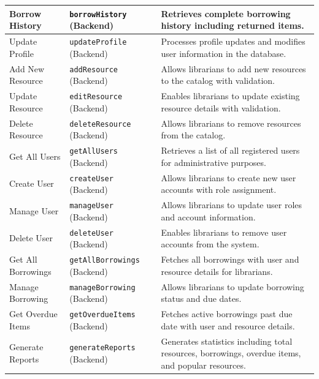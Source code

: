 \documentclass[11pt,a4paper]{article}
\begin{document}
\begin{longtable}{@{}p{3cm}p{4cm}p{6cm}@{}}
Borrow History & \texttt{borrowHistory} (Backend) & Retrieves complete borrowing history including returned items. \\
\midrule

Update Profile & \texttt{updateProfile} (Backend) & Processes profile updates and modifies user information in the database. \\
\midrule

Add New Resource & \texttt{addResource} (Backend) & Allows librarians to add new resources to the catalog with validation. \\
\midrule

Update Resource & \texttt{editResource} (Backend) & Enables librarians to update existing resource details with validation. \\
\midrule

Delete Resource & \texttt{deleteResource} (Backend) & Allows librarians to remove resources from the catalog. \\
\midrule

Get All Users & \texttt{getAllUsers} (Backend) & Retrieves a list of all registered users for administrative purposes. \\
\midrule

Create User & \texttt{createUser} (Backend) & Allows librarians to create new user accounts with role assignment. \\
\midrule

Manage User & \texttt{manageUser} (Backend) & Allows librarians to update user roles and account information. \\
\midrule

Delete User & \texttt{deleteUser} (Backend) & Enables librarians to remove user accounts from the system. \\
\midrule

Get All Borrowings & \texttt{getAllBorrowings} (Backend) & Fetches all borrowings with user and resource details for librarians. \\
\midrule

Manage Borrowing & \texttt{manageBorrowing} (Backend) & Allows librarians to update borrowing status and due dates. \\
\midrule

Get Overdue Items & \texttt{getOverdueItems} (Backend) & Fetches active borrowings past due date with user and resource details. \\
\midrule

Generate Reports & \texttt{generateReports} (Backend) & Generates statistics including total resources, borrowings, overdue items, and popular resources. \\
\midrule


\end{longtable}
\end{document}
